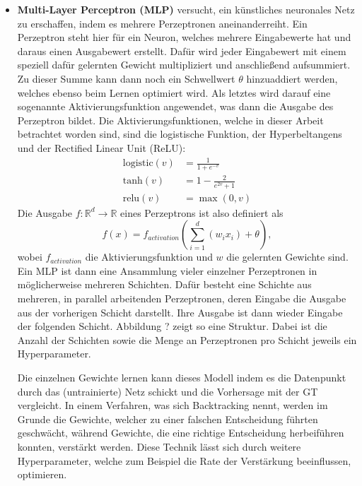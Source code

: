 \begin{itemize}
   \item \textbf{Multi-Layer Perceptron (MLP)} versucht, ein künstliches neuronales Netz zu erschaffen, indem es
    mehrere Perzeptronen aneinanderreiht. Ein Perzeptron steht hier für ein Neuron, welches mehrere Eingabewerte
    hat und daraus einen Ausgabewert erstellt. Dafür wird jeder Eingabewert mit einem speziell dafür gelernten
    Gewicht multipliziert und anschließend aufsummiert. Zu dieser Summe kann dann noch ein Schwellwert $\theta$
    hinzuaddiert werden, welches ebenso beim Lernen optimiert wird. Als letztes wird darauf eine sogenannte
    Aktivierungsfunktion angewendet, was dann die Ausgabe des Perzeptron bildet. Die Aktivierungsfunktionen,
    welche in dieser Arbeit betrachtet worden sind, sind die logistische Funktion, der Hyperbeltangens und der
    Rectified Linear Unit (ReLU):
    \begin{align}
        \text{logistic}(v) &= \frac{1}{1+e^{-v}}\\
        \text{tanh}(v)     &= 1-\frac{2}{e^{2v}+1}\\
        \text{relu}(v)     &= \max(0, v)
    \end{align}
    Die Ausgabe $f : \mathbb{R}^d \rightarrow \mathbb{R}$ eines Perzeptrons ist also definiert als
    \begin{equation}
            f(x) = f_{activation}(\sum_{i=1}^d(w_ix_i)+\theta),
    \end{equation}
    wobei $f_{activation}$ die Aktivierungsfunktion und $w$ die gelernten Gewichte sind. Ein MLP ist dann eine
    Ansammlung vieler einzelner Perzeptronen in möglicherweise mehreren Schichten. Dafür besteht eine Schichte
    aus mehreren, in parallel arbeitenden Perzeptronen, deren Eingabe die Ausgabe aus der vorherigen Schicht
    darstellt. Ihre Ausgabe ist dann wieder Eingabe der folgenden Schicht. Abbildung ? zeigt so eine Struktur.
    Dabei ist die Anzahl der Schichten sowie die Menge an Perzeptronen pro Schicht jeweils ein Hyperparameter.

    Die einzelnen Gewichte lernen kann dieses Modell indem es die Datenpunkt durch das (untrainierte) Netz
    schickt und die Vorhersage mit der GT vergleicht. In einem Verfahren, was sich Backtracking nennt, werden
    im Grunde die Gewichte, welcher zu einer falschen Entscheidung führten geschwächt, während Gewichte, die
    eine richtige Entscheidung herbeiführen konnten, verstärkt werden. Diese Technik lässt sich durch weitere
    Hyperparameter, welche zum Beispiel die Rate der Verstärkung beeinflussen, optimieren.


\end{itemize}
